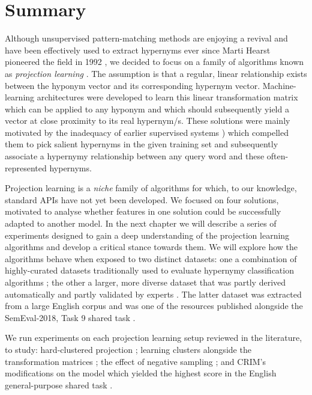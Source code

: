 \section{Summary}
Although unsupervised pattern-matching methods are enjoying a revival \citep{roller2018hearst} and have been effectively used to extract hypernyms ever since Marti Hearst pioneered the field in 1992 \citep{hearst1992automatic}, we decided to focus on a family of algorithms known as \textit{projection learning} \citep{ustalov2017negative}.  The assumption is that a regular, linear relationship exists between the hyponym vector and its corresponding hypernym vector.  Machine-learning architectures were developed to learn this linear transformation matrix which can be applied to any hyponym and which should subsequently yield a vector at close proximity to its real hypernym/s.  These solutions were mainly motivated by the inadequacy of earlier supervised systems \citep{baroni2012entailment, weeds2014learning}) which compelled them to pick salient hypernyms in the given training set and subsequently associate a hypernymy relationship between any query word and these often-represented hypernyms.

Projection learning is a \textit{niche} family of algorithms for which, to our knowledge, standard APIs have not yet been developed.  
We focused on four solutions, motivated to analyse whether features in one solution could be successfully adapted to another model. 
In the next chapter we will describe a series of experiments designed to gain a deep understanding of the projection learning algorithms and develop a critical stance towards them.  We will explore how the algorithms behave when exposed to two distinct datasets: one a combination of highly-curated datasets traditionally used to evaluate hypernymy classification algorithms \citep{Baroni2011, santus2015evalution, santus2016nine, necsulescu2015reading}; the other a larger, more diverse dataset that was partly derived automatically and partly validated by experts \citep{camacho2018semeval}.  The latter dataset was extracted from a large English corpus and was one of the resources published alongside the SemEval-2018, Task 9 shared task \citep{camacho2018semeval}.

We run experiments on each projection learning setup reviewed in the literature, to study: hard-clustered projection \citep{Fu2014}; learning clusters alongside the transformation matrices \citep{yamane2016distributional}; the effect of negative sampling \citep{ustalov2017negative}; and \ac{CRIM}’s modifications on the \citep{yamane2016distributional} model which yielded the highest score in the English general-purpose shared task \citep{bernier2018crim}.  

